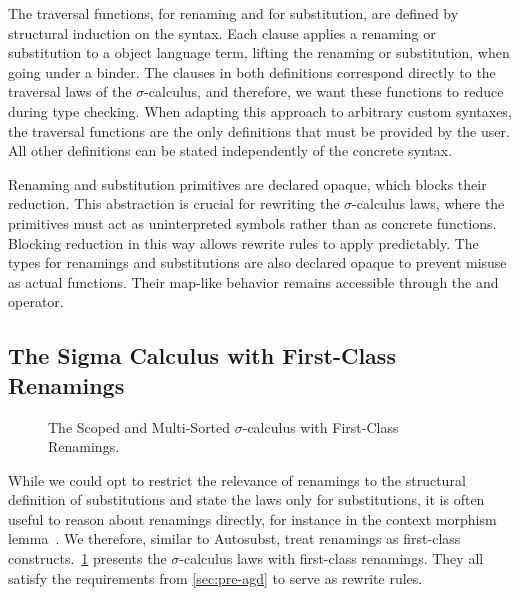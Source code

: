 \documentclass[screen,nonacm]{acmart}
\begin{document}
The traversal functions,  for renaming and
 for substitution, are defined by structural induction on
the syntax. Each clause applies a renaming or substitution to a object language
term, lifting the renaming or substitution, when going under a binder. The
clauses in both definitions correspond directly to the traversal laws of the
$σ$-calculus, and therefore, we want these functions to reduce during type
checking. When adapting this approach to arbitrary custom syntaxes, the
traversal functions are the only definitions that must be provided by the user.
All other definitions can be stated independently of the concrete syntax.

Renaming and substitution primitives are declared opaque, which blocks their
reduction. This abstraction is crucial for rewriting the $σ$-calculus laws,
where the primitives must act as uninterpreted symbols rather than as concrete
functions. Blocking reduction in this way allows rewrite rules to apply
predictably. The types for renamings and substitutions are also declared opaque
to prevent misuse as actual functions. Their map-like behavior remains
accessible through the  and 
operator.

\subsection{The Sigma Calculus with First-Class Renamings}\label{sec:mis-sig}
\begin{figure}[t]
      \centering

      \begin{minipage}[t]{0.38\linewidth}
            \raggedright{}
            \EDefLaws{}
            \ERewriteSys{}
            \ERewriteSysT{}
      \end{minipage}
      \hfill
      \begin{minipage}[t]{0.58\linewidth}
            \raggedright{}
            \EInteractLaws{}
            \EMonadLaws{}
      \end{minipage}
      \caption{The Scoped and Multi-Sorted $σ$-calculus with First-Class Renamings.}\label{fig:mis-sig}
\end{figure}

While we could opt to restrict the relevance of renamings to the structural
definition of substitutions and state the laws only for substitutions, it is
often useful to reason about renamings directly, for instance in the context
morphism lemma~\cite{goguen1997candidates}. We therefore, similar to Autosubst,
treat renamings as first-class constructs.\ \cref{fig:mis-sig} presents the
$σ$-calculus laws with first-class renamings. They all satisfy the requirements
from \cref{sec:pre-agd} to serve as rewrite rules.
\end{document}
